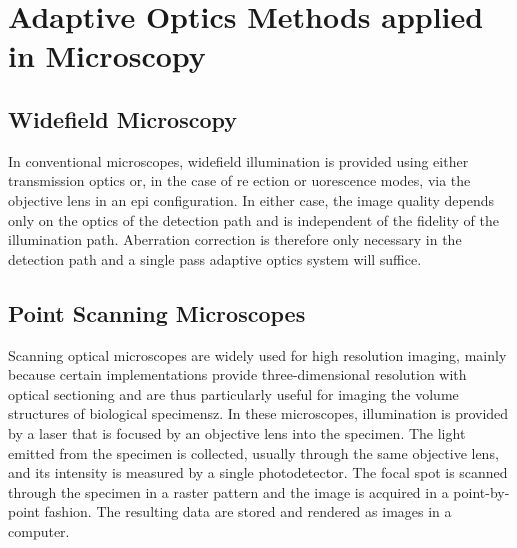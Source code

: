
\section{Adaptive Optics Methods applied in Microscopy}
\label{sec:ExperimentDiscussion}


\cite{adaptive_optics_bio_microscope}


\subsection{Widefield Microscopy}
\label{sec:WidefieldMicroscopy}

In conventional microscopes, widefield illumination is provided using either 
transmission optics or, in the case of re ection or uorescence modes, via the 
objective lens in an epi configuration. In either case, the image quality 
depends only on the optics of the detection path and is independent of the 
fidelity of the illumination path.
Aberration correction is therefore only necessary in the detection path and a 
single pass adaptive optics system will suffice.

\subsection{Point Scanning Microscopes}
\label{sec:PointScanningMicroscopes}

Scanning optical microscopes are widely used for high resolution imaging, 
mainly because certain implementations provide three-dimensional resolution 
with optical sectioning and are thus particularly useful for imaging the 
volume structures of biological specimensz. In these microscopes, 
illumination is provided by a laser that is focused by an objective lens into 
the specimen. The light emitted from the specimen is collected, usually 
through the same objective lens, and its intensity is measured by a single 
photodetector. The focal spot is scanned through the specimen in a raster 
pattern and the image is acquired in a point-by-point fashion. The resulting 
data are stored and rendered as images in a computer.

